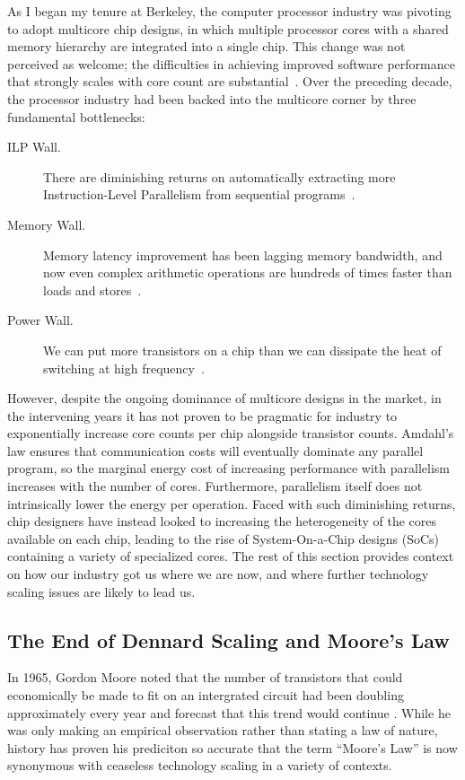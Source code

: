 As I began my tenure at Berkeley, the computer processor industry was pivoting to adopt multicore chip designs,
in which multiple processor cores with a shared memory hierarchy are integrated into a single chip.
This change was not perceived as welcome; the difficulties in achieving improved software performance that strongly scales with core count are substantial~\cite{Asanovic:EECS-2006-183}.
Over the preceding decade, the processor industry had been backed into the multicore corner by three fundamental bottlenecks:
\begin{description}
\item[ILP Wall.] There are diminishing returns on automatically extracting more Instruction-Level Parallelism from sequential programs~\cite{hennessy2011computer}.
\item[Memory Wall.] Memory latency improvement has been lagging memory bandwidth, and now even complex arithmetic operations are hundreds of times faster than loads and stores~\cite{wulf1995hitting}.
\item[Power Wall.] We can put more transistors on a chip than we can dissipate the heat of switching at high frequency~\cite{shacham-micro10}.
\end{description}

However, despite the ongoing dominance of multicore designs in the market, in the intervening years it has not proven to be pragmatic for industry to exponentially increase core counts per chip alongside transistor counts.
Amdahl's law ensures that communication costs will eventually dominate any parallel program, so the marginal energy cost of increasing performance with parallelism increases with the number of cores.
Furthermore, parallelism itself does not intrinsically lower the energy per operation.
Faced with such diminishing returns, chip designers have instead looked to increasing the heterogeneity of the cores available on each chip, leading to the rise of System-On-a-Chip designs (SoCs) containing a variety of specialized cores.
The rest of this section provides context on how our industry got us where we are now, and where further technology scaling issues are likely to lead us.

\subsection{The End of Dennard Scaling and Moore's Law}

In 1965, Gordon Moore noted that the number of transistors that could economically be made to fit on an intergrated circuit had been doubling approximately every year and forecast that this trend would continue \cite{moore2006cramming}.
While he was only making an empirical observation rather than stating a law of nature, history has proven his prediciton so accurate that the term ``Moore's Law'' is now synonymous with ceaseless technology scaling in a variety of contexts.

